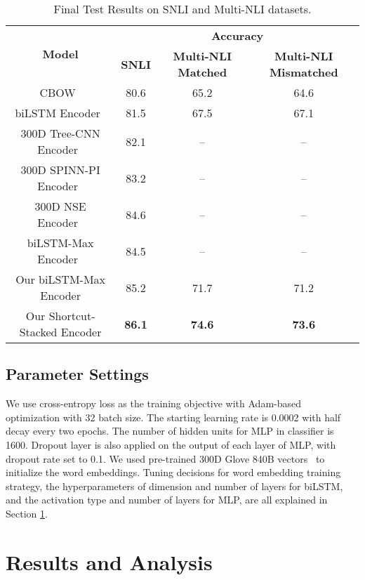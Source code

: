 \documentclass[11pt,letterpaper]{article}
\begin{document}
\begin{table*}[ht!]
\begin{center}
\small
\begin{tabular}{|c|ccc|}
\hline
\multirow{2}{*}{\bf Model} & \multicolumn{3}{|c|}{\bf Accuracy} \\
\ & {\bf SNLI} & {\bf Multi-NLI Matched} & {\bf Multi-NLI Mismatched} \\
\hline
CBOW~\cite{williams2017broad} & 80.6 & 65.2 & 64.6 \\
biLSTM Encoder~\cite{williams2017broad} & 81.5 & 67.5 & 67.1 \\
300D Tree-CNN Encoder~\cite{mou2015natural} & 82.1 & -- & -- \\
300D SPINN-PI Encoder~\cite{bowman2016fast} & 83.2 & -- & -- \\
300D NSE Encoder~\cite{munkhdalai2016neural} & 84.6 & -- & -- \\
biLSTM-Max Encoder~\cite{conneau2017supervised} & 84.5 & -- & -- \\
\hline
Our biLSTM-Max Encoder & 85.2 & 71.7 & 71.2 \\
Our Shortcut-Stacked Encoder & {\bf 86.1} & {\bf 74.6} & {\bf 73.6}\\
\hline
\end{tabular}
\end{center}
\vspace{-7pt}
\caption{Final Test Results on SNLI and Multi-NLI datasets.
}
\vspace{-2pt}
\label{tab:encoder_snli}
\end{table*}

\subsection{Parameter Settings}
We use cross-entropy loss as the training objective with Adam-based ~\cite{kingma2014adam} optimization with 32 batch size. The starting learning rate is 0.0002 with half decay every two epochs. The number of hidden units for MLP in classifier is 1600. Dropout layer is also applied on the output of each layer of MLP, with dropout rate set to 0.1. We used pre-trained 300D Glove 840B vectors~\cite{pennington2014glove} to initialize the word embeddings. Tuning decisions for word embedding training strategy, the hyperparameters of dimension and number of layers for biLSTM, and the activation type and number of layers for MLP, are all explained in Section \ref{sec:result}.



\section{Results and Analysis}
\label{sec:result}
\end{document}
